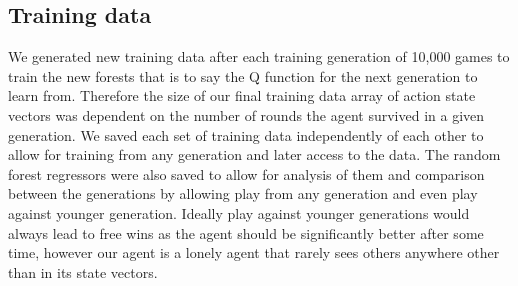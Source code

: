 	\subsection{Training data}
	We generated new training data after each training generation of 10,000 games to train the new forests that is to say the Q function for the next generation to learn from. Therefore the size of our final training data array of action state vectors was dependent on the number of rounds the agent survived in a given generation. We saved each set of training data independently of each other to allow for training from any generation and later access to the data. The random forest regressors were also saved to allow for analysis of them and comparison between the generations by allowing play from any generation and even play against younger generation. Ideally play against younger generations would always lead to free wins as the agent should be significantly better after some time, however our agent is a lonely agent that rarely sees others anywhere other than in its state vectors.
